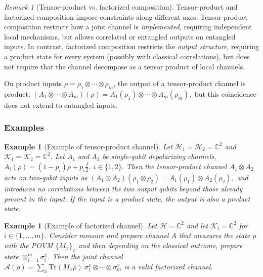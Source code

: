 \documentclass[11pt]{article}
\theoremstyle{plain}
\newtheorem{example}[theo]{Example}
\theoremstyle{remark}
\newtheorem{remark}[theo]{Remark}
\begin{document}
\begin{remark}[Tensor-product vs. factorized composition]
\label{rem:tensor-vs-factorized}
Tensor-product and factorized composition impose constraints along different
axes. Tensor-product composition restricts how a joint channel is \emph{implemented},
requiring independent local mechanisms, but allows correlated or entangled outputs
on entangled inputs. In contrast, factorized composition restricts the \emph{output
structure}, requiring a product state for every system (possibly with classical correlations), but does not require that
the channel decompose as a tensor product of local channels.

On product inputs $\rho=\rho_1\otimes\cdots\otimes\rho_m$, the output of a
tensor-product channel is product:
$
(A_1\otimes\cdots\otimes A_m)(\rho)
=
A_1(\rho_1)\otimes\cdots\otimes A_m(\rho_m),
$
but this coincidence does not extend to entangled inputs.
\end{remark}




\subsubsection{Examples}

\begin{example}[Example of tensor-product channel]
Let $\mathcal{H}_1=\mathcal{H}_2=\mathbb{C}^2$ and
$\mathcal{K}_1=\mathcal{K}_2=\mathbb{C}^2$.
Let $A_1$ and $A_2$ be single-qubit depolarizing channels,
$
A_i(\rho) = (1-p_i)\rho + p_i \frac{I}{2}, \ i\in\{1,2\}.
$
Then the tensor-product channel $A_1\otimes A_2$ acts on two-qubit inputs as
$
(A_1\otimes A_2)(\rho_1\otimes\rho_2)
= A_1(\rho_1)\otimes A_2(\rho_2),
$
and introduces no correlations between the two output qubits beyond those already present in the
input. If the input is a product state, the output is also a product state.
\label{ex:tensor-product}
\end{example}

\begin{example}[Example of factorized channel] 
Let $\mathcal H=\mathbb C^2$ and let $\mathcal K_i=\mathbb C^2$ for $i \in \{1, \ldots, m\}$.
Consider measure and prepare channel $A$ that measures the state $\rho$ with the POVM $\{M_x\}_x$ and then depending on the classical outcome, prepare state $ \otimes_{i=1}^m \sigma_i^x$.
Then the joint channel \\ 
$
\mathcal A(\rho)= \sum_x \mathrm{Tr}(M_x\rho) \ \sigma_1^x \otimes \cdots \otimes \sigma_m^x
$
is a valid factorized channel.

\label{ex:factorized}
\end{example}
\end{document}

